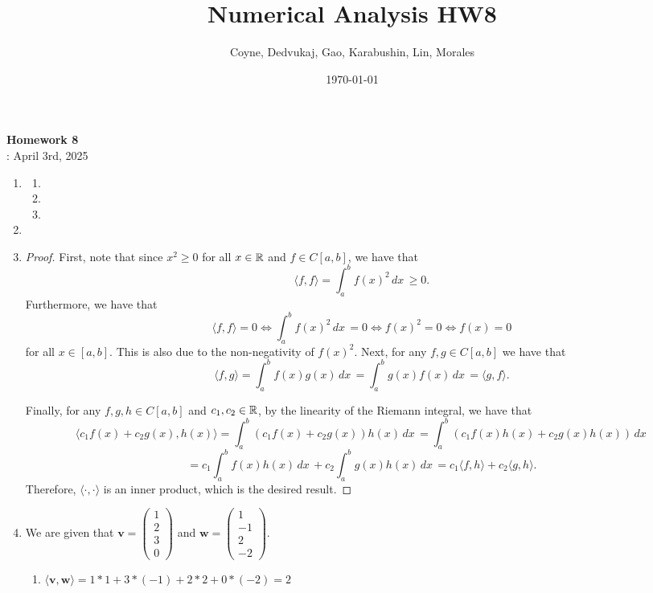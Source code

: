 \documentclass[12pt]{article}
\title{Numerical Analysis HW8}
\author{Coyne, Dedvukaj, Gao, Karabushin, Lin, Morales}
\date{\today}
\begin{document}
\pagestyle{fancy}


\begin{center}
\textbf{\Large Homework 8} \\
: April 3rd, 2025
\end{center}

\begin{enumerate}[leftmargin=0em]
  \item
  \begin{enumerate}[leftmargin=!]
    \item

    \item

    \item
  \end{enumerate}

  \item
  
  \item
  \begin{proof}
    First, note that since $x^2\geq 0$ for all $x\in \mathbb{R}$ and $f\in C[a,b]$, we have that
    \[\langle f,f \rangle= \int_{a}^{b}f(x)^2\, dx\, \geq 0.\]
    Furthermore, we have that
    \[\langle f, f\rangle = 0 \iff \int_{a}^{b}f(x)^2\, dx\, = 0 \iff f(x)^2 = 0 \iff f(x) = 0\]
    for all $x\in [a,b]$. This is also due to the non-negativity of $f(x)^2$. Next, for any $f,g\in C[a,b]$ we have that
    \[\langle f, g \rangle = \int_{a}^{b} f(x)g(x)\, dx\, = \int_{a}^{b} g(x)f(x)\, dx\, = \langle g, f \rangle.\]

    \noindent Finally, for any $f,g,h \in C[a,b]$ and $c_{1},c_{2}\in \mathbb{R}$, by the linearity of the Riemann integral, we have that
    \[\langle c_{1}f(x)+c_{2}g(x), h(x)\rangle = \int_{a}^{b} (c_{1}f(x)+c_{2}g(x))h(x)\, dx\, = \int_{a}^{b} (c_{1}f(x)h(x)+c_{2}g(x)h(x))\, dx\,\] 
    \[= c_{1}\int_{a}^{b} f(x)h(x)\, dx\, +c_{2}\int_{a}^{b} g(x)h(x)\, dx\, = c_{1}\langle f,h\rangle+c_{2} \langle g , h\rangle.\]
    Therefore, $\langle \cdot, \cdot \rangle$ is an inner product, which is the desired result. 
  \end{proof}
  
  \item
  We are given that $\mathbf{v} = \begin{pmatrix}
    1\\
    2\\
    3\\
    0
  \end{pmatrix}$ and
  $\mathbf{w} = \begin{pmatrix}
    1\\
    -1\\
    2\\
    -2
  \end{pmatrix}$.
  \begin{enumerate}[leftmargin=!]
    \item $\langle \mathbf{v} , \mathbf{w} \rangle = 1 * 1 + 3 * (-1) + 2 * 2 + 0 * (-2) = 2$


\end{enumerate}
\end{enumerate}
\end{document}
